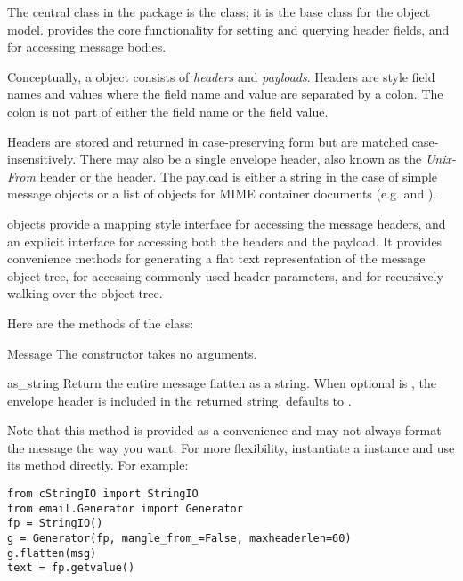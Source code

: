 
The central class in the  package is the
 class; it is the base class for the 
object model.   provides the core functionality for
setting and querying header fields, and for accessing message bodies.

Conceptually, a  object consists of \emph{headers} and
\emph{payloads}.  Headers are  style field names and
values where the field name and value are separated by a colon.  The
colon is not part of either the field name or the field value.

Headers are stored and returned in case-preserving form but are
matched case-insensitively.  There may also be a single envelope
header, also known as the \emph{Unix-From} header or the
 header.  The payload is either a string in the case of
simple message objects or a list of  objects for
MIME container documents (e.g.  and
).

 objects provide a mapping style interface for
accessing the message headers, and an explicit interface for accessing
both the headers and the payload.  It provides convenience methods for
generating a flat text representation of the message object tree, for
accessing commonly used header parameters, and for recursively walking
over the object tree.

Here are the methods of the  class:

\begin{classdesc}{Message}{}
The constructor takes no arguments.
\end{classdesc}

\begin{methoddesc}[Message]{as_string}{}
Return the entire message flatten as a string.  When optional
 is , the envelope header is included in the
returned string.   defaults to .

Note that this method is provided as a convenience and may not always
format the message the way you want.  For more flexibility,
instantiate a  instance and use its
 method directly.  For example:

\begin{verbatim}
from cStringIO import StringIO
from email.Generator import Generator
fp = StringIO()
g = Generator(fp, mangle_from_=False, maxheaderlen=60)
g.flatten(msg)
text = fp.getvalue()
\end{verbatim}
\end{methoddesc}

